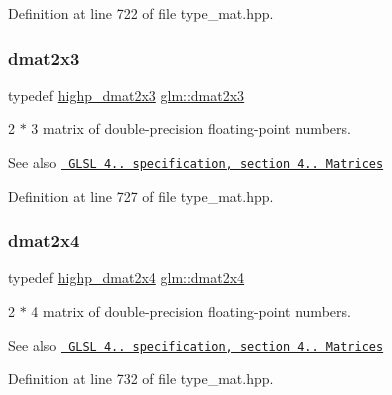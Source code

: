 Definition at line 722 of file type\+\_\+mat.\+hpp.

\mbox{\label{group__core__types_ga6b5ff9888ca0e468f35b637d4c3a361d}} 
\subsubsection{\texorpdfstring{dmat2x3}{dmat2x3}}
{\footnotesize\ttfamily typedef \mbox{\hyperlink{group__core__precision_ga29884defff6f7109b1e99ef8a6ce7e0a}{highp\+\_\+dmat2x3}} \mbox{\hyperlink{group__core__types_ga6b5ff9888ca0e468f35b637d4c3a361d}{glm\+::dmat2x3}}}

2 $\ast$ 3 matrix of double-\/precision floating-\/point numbers.

\begin{DoxySeeAlso}{See also}
\href{http://www.opengl.org/registry/doc/GLSLangSpec.4.20.8.pdf}{\texttt{ G\+L\+SL 4.. specification, section 4.. Matrices}} 
\end{DoxySeeAlso}


Definition at line 727 of file type\+\_\+mat.\+hpp.

\mbox{\label{group__core__types_ga2d1dd4b4925d1ea67539902c820483a0}} 
\subsubsection{\texorpdfstring{dmat2x4}{dmat2x4}}
{\footnotesize\ttfamily typedef \mbox{\hyperlink{group__core__precision_ga2b1bf87a8f8fbc895127c6bfde7a271e}{highp\+\_\+dmat2x4}} \mbox{\hyperlink{group__core__types_ga2d1dd4b4925d1ea67539902c820483a0}{glm\+::dmat2x4}}}

2 $\ast$ 4 matrix of double-\/precision floating-\/point numbers.

\begin{DoxySeeAlso}{See also}
\href{http://www.opengl.org/registry/doc/GLSLangSpec.4.20.8.pdf}{\texttt{ G\+L\+SL 4.. specification, section 4.. Matrices}} 
\end{DoxySeeAlso}


Definition at line 732 of file type\+\_\+mat.\+hpp.

\mbox{\label{group__core__types_ga25fd62195c3ef5ac0d32ead1dbfbb929}} 

